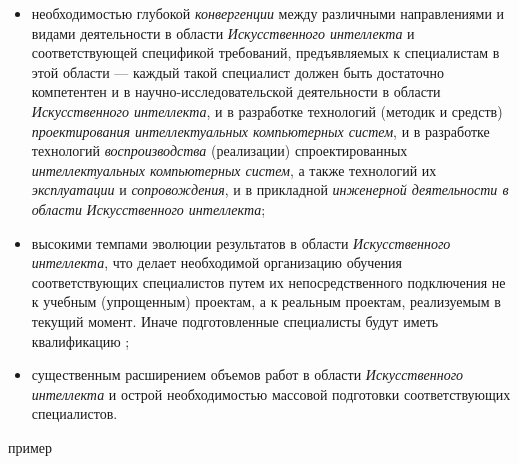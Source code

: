 \begin{scnsubstruct}
\begin{scnindent}
\begin{scneqtoset}
\begin{scnindent}
{\begin{itemize}
						\item необходимостью глубокой \textit{конвергенции} между различными направлениями и видами деятельности в области \textit{Искусственного интеллекта} и соответствующей спецификой требований, предъявляемых к специалистам в этой области --- каждый такой специалист должен быть достаточно компетентен и в научно-исследовательской деятельности в области \textit{Искусственного интеллекта}, и в разработке технологий (методик и средств) \textit{проектирования интеллектуальных компьютерных систем}, и в разработке технологий \textit{воспроизводства} (реализации) спроектированных \textit{интеллектуальных компьютерных систем}, а также технологий их \textit{эксплуатации} и \textit{сопровождения}, и в прикладной \textit{инженерной деятельности в области} \textit{Искусственного интеллекта};
						\item высокими темпами эволюции результатов в области \textit{Искусственного интеллекта}, что делает необходимой организацию обучения соответствующих специалистов путем их непосредственного подключения не к учебным (упрощенным) проектам, а к реальным проектам, реализуемым в текущий момент. Иначе подготовленные специалисты будут иметь квалификацию ;
						\item существенным расширением объемов работ в области \textit{Искусственного интеллекта} и острой необходимостью массовой подготовки соответствующих специалистов.
					\end{itemize}}
			\end{scnindent}
			\begin{scnindent}
				\begin{scnindent}
					\begin{scnrelfromlist}{пример}

\end{scnrelfromlist}
\end{scnindent}
\end{scnindent}
\end{scneqtoset}
\end{scnindent}
\end{scnsubstruct}
